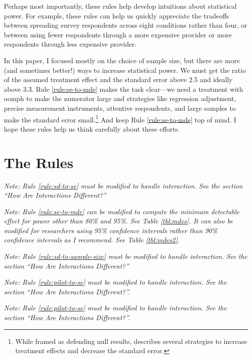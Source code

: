 \documentclass[12pt]{article}
\begin{document}
Perhaps most importantly, these rules help develop intuitions about statistical power. 
For example, these rules can help us quickly appreciate the tradeoffs between spreading survey respondents across eight conditions rather than four, or between using fewer respondents through a more expensive provider or more respondents through less expensive provider.

In this paper, I focused mostly on the choice of sample size, but there are more (and sometimes better!) ways to increase statistical power. 
We must get the ratio of the assumed treatment effect and the standard error above 2.5 and ideally above 3.3. 
Rule \ref{rule:se-to-mde} makes the task clear---we need a treatment with oomph to make the numerator large and strategies like regression adjustment, precise measurement instruments, attentive respondents, and large samples to make the standard error small.\footnote{
  While framed as defending null results, \cite{Kane2024} describes several strategies to increase treatment effects and decrease the standard error.
  }
And keep Rule \ref{rule:se-to-mde} top of mind.
I hope these rules help us think carefully about these efforts.


\singlespace
\clearpage
\small



\appendix
\doublespace


\section{The Rules}

{}
{}

{\noindent \footnotesize\textit{Note: Rule \ref{rule:sd-to-se} must be modified to handle interaction. See the section ``How Are Interactions Different?''}}



{\noindent \footnotesize \textit{Note: Rule \ref{rule:se-to-mde} can be modified to compute the minimum detectable effect for power other than 80\% and 95\%. See Table \ref{tbl:mdes}. It can also be modified for researchers using 95\% confidence intervals rather than 90\% confidence intervals as I recommend. See Table \ref{tbl:mdes2}.}}


{\noindent \footnotesize \textit{Note: Rule \ref{rule:sd-to-sample-size} must be modified to handle interaction. See the section ``How Are Interactions Different?''}}

{}
{}

{\noindent \footnotesize \textit{Note: Rule \ref{rule:pilot-to-se} must be modified to handle interaction. See the section ``How Are Interactions Different?''.}}


{\noindent \footnotesize \textit{Note: Rule \ref{rule:pilot-to-se} must be modified to handle interaction. See the section ``How Are Interactions Different?''.}}

\end{document}
